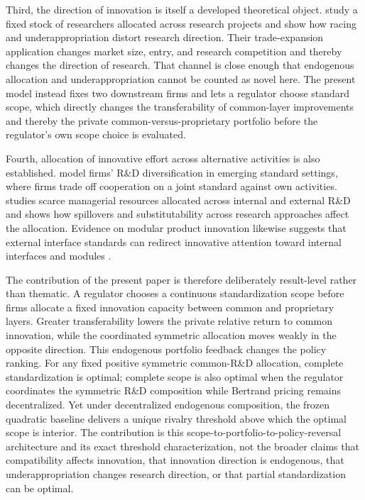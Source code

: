 Third, the direction of innovation is itself a developed theoretical object. \citet{BryanLemus2017} study a fixed stock of researchers allocated across research projects and show how racing and underappropriation distort research direction. Their trade-expansion application changes market size, entry, and research competition and thereby changes the direction of research. That channel is close enough that endogenous allocation and underappropriation cannot be counted as novel here. The present model instead fixes two downstream firms and lets a regulator choose standard scope, which directly changes the transferability of common-layer improvements and thereby the private common-versus-proprietary portfolio before the regulator's own scope choice is evaluated.

Fourth, allocation of innovative effort across alternative activities is also established. \citet{KretschmerReitzig2013} model firms' R\&D diversification in emerging standard settings, where firms trade off cooperation on a joint standard against own activities. \citet{daSilva2024} studies scarce managerial resources allocated across internal and external R\&D and shows how spillovers and substitutability across research approaches affect the allocation. Evidence on modular product innovation likewise suggests that external interface standards can redirect innovative attention toward internal interfaces and modules \citep{ChenLiu2005}.

The contribution of the present paper is therefore deliberately result-level rather than thematic. A regulator chooses a continuous standardization scope before firms allocate a fixed innovation capacity between common and proprietary layers. Greater transferability lowers the private relative return to common innovation, while the coordinated symmetric allocation moves weakly in the opposite direction. This endogenous portfolio feedback changes the policy ranking. For any fixed positive symmetric common-R\&D allocation, complete standardization is optimal; complete scope is also optimal when the regulator coordinates the symmetric R\&D composition while Bertrand pricing remains decentralized. Yet under decentralized endogenous composition, the frozen quadratic baseline delivers a unique rivalry threshold above which the optimal scope is interior. The contribution is this scope-to-portfolio-to-policy-reversal architecture and its exact threshold characterization, not the broader claims that compatibility affects innovation, that innovation direction is endogenous, that underappropriation changes research direction, or that partial standardization can be optimal.
